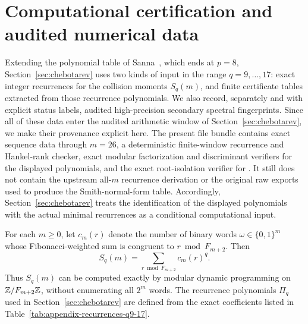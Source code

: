 \section{Computational certification and audited numerical data}
\label{app:certification}

Extending the polynomial table of Sanna~\cite{Sanna2025}, which ends at
\(p=8\), Section~\ref{sec:chebotarev} uses two kinds of input in the range
\(q=9,\dots,17\): exact integer recurrences for the collision moments
\(S_q(m)\), and finite certificate tables extracted from those recurrence
polynomials.  We also record, separately and with explicit status labels,
audited high-precision secondary spectral fingerprints.  Since all of these
data enter the audited arithmetic window of Section~\ref{sec:chebotarev}, we
make their provenance explicit here.  The present file bundle contains
exact sequence data through $m=26$, a deterministic finite-window recurrence
and Hankel-rank checker, exact modular factorization and discriminant verifiers
for the displayed polynomials, and the exact root-isolation verifier for
.  It still does not contain the upstream
all-$m$ recurrence derivation or the original raw exports used to produce the
Smith-normal-form table.  Accordingly, Section~\ref{sec:chebotarev} treats
the identification of the displayed polynomials with the actual minimal
recurrences as a conditional computational input.

For each \(m\ge 0\), let \(c_m(r)\) denote the number of binary words
\(\omega\in\{0,1\}^m\) whose Fibonacci-weighted sum is congruent to
\(r\bmod F_{m+2}\).  Then
\[
  S_q(m)=\sum_{r\bmod F_{m+2}} c_m(r)^q.
\]
Thus \(S_q(m)\) can be computed exactly by modular dynamic programming on
\(\mathbb{Z}/F_{m+2}\mathbb{Z}\), without enumerating all \(2^m\) words.  The recurrence
polynomials \(\Pi_q\) used in Section~\ref{sec:chebotarev} are defined from the
exact coefficients listed in Table~\ref{tab:appendix-recurrences-q9-17}.

